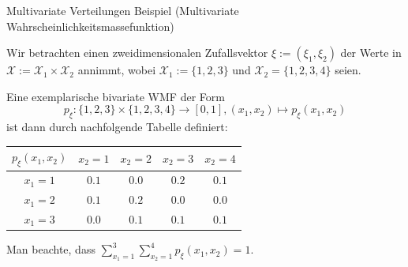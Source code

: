 \documentclass[
  8pt,
  ignorenonframetext,
]{beamer}
\begin{document}
\begin{frame}{Multivariate Verteilungen}
\protect\hypertarget{multivariate-verteilungen-3}{}
Beispiel (Multivariate Wahrscheinlichkeitsmassefunktion)

\vspace{2mm}

\small
\justifying

Wir betrachten einen zweidimensionalen Zufallsvektor
\(\xi:= (\xi_1,\xi_2)\) der Werte in
\(\mathcal{X} := \mathcal{X}_1 \times \mathcal{X}_2\) annimmt, wobei
\(\mathcal{X}_1 := \{1,2,3\}\) und \(\mathcal{X}_2 = \{1,2,3,4\}\)
seien.

Eine exemplarische bivariate WMF der Form \begin{equation}
p_\xi: \{1,2,3\} \times \{1,2,3,4\} \to [0,1], (x_1,x_2) \mapsto p_\xi(x_1,x_2)
\end{equation} ist dann durch nachfolgende Tabelle definiert:
\vspace{1mm}

\begin{table}\label{tab:wmf_bivariat}
\begin{center}
\begin{tabular}{|c|cccc|}
\hline
$p_\xi(x_1,x_2)$    &   $x_2 = 1$   &   $x_2 = 2$   &   $x_2 = 3$   &   $x_2 = 4$   \\\hline
$x_1 = 1$       &   $0.1$       &   $0.0$       &   $0.2$       &   $0.1$       \\
$x_1 = 2$       &   $0.1$       &   $0.2$       &   $0.0$       &   $0.0$       \\
$x_1 = 3$       &   $0.0$       &   $0.1$       &   $0.1$       &   $0.1$       \\\hline
\end{tabular}
\end{center}
\end{table}
\vspace{1mm}

Man beachte, dass
\(\sum_{x_1 = 1}^3 \sum_{x_2 = 1}^4 p_\xi(x_1,x_2) = 1\).
\end{frame}
\end{document}
